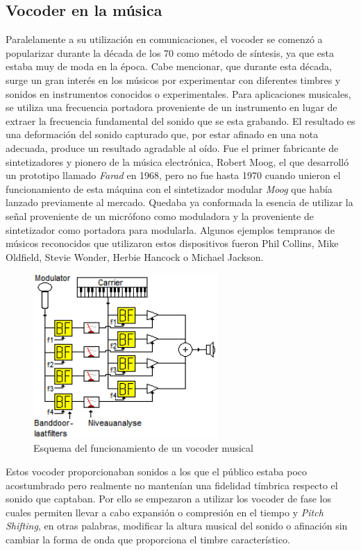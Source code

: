 \subsection{Vocoder en la música}
Paralelamente a su utilización en comunicaciones, el vocoder se comenzó a popularizar durante la década de los 70 como método de síntesis, ya que esta estaba muy de moda en la época. Cabe mencionar, que durante esta década, surge un gran interés en los músicos por experimentar con diferentes timbres y sonidos en instrumentos conocidos o experimentales. Para aplicaciones musicales, se utiliza una frecuencia portadora proveniente de un instrumento en lugar de extraer la frecuencia fundamental del sonido que se esta grabando. El resultado es una deformación del sonido capturado que, por estar afinado en una nota adecuada, produce un resultado agradable al oído. Fue el primer fabricante de sintetizadores y pionero de la música electrónica, Robert Moog, el que desarrolló un prototipo llamado \emph{Farad} en 1968, pero no fue hasta 1970 cuando unieron el funcionamiento de esta máquina con el sintetizador modular \emph{Moog} que había lanzado previamente al mercado. Quedaba ya conformada la esencia de utilizar la señal proveniente de un micrófono como moduladora y la proveniente de sintetizador como portadora para modularla. Algunos ejemplos tempranos de músicos reconocidos que utilizaron estos dispositivos fueron Phil Collins, Mike Oldfield, Stevie Wonder, Herbie Hancock o Michael Jackson.

\begin{figure}
\begin{center}
\includegraphics[width=7cm]{img/music_vocoder.png}
\caption{Esquema del funcionamiento de un vocoder musical}
\end{center}
\end{figure}

Estos vocoder proporcionaban sonidos a los que el público estaba poco acostumbrado pero realmente no mantenían una fidelidad tímbrica respecto el sonido que captaban. Por ello se empezaron a utilizar los vocoder de fase los cuales permiten llevar a cabo expansión o compresión en el tiempo y \emph{Pitch Shifting}, en otras palabras, modificar la altura musical del sonido o afinación sin cambiar la forma de onda que proporciona el timbre característico.

